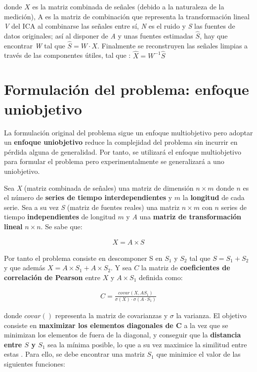  donde $X$ es la matriz combinada de señales (debido a la naturaleza de la medición), A es la matriz de combinación que representa la transformación lineal \textit{V} del ICA al combinarse las señales entre sí, \textit{N} es el ruido y \textit{S} las fuentes de datos originales; así al disponer de \textit{A} y unas fuentes estimadas $\hat{S}$, hay que encontrar \textit{W} tal que $\hat{S} = W\cdot X$. Finalmente se reconstruyen las señales limpias a través de las componentes útiles, tal que : $\hat{X} = W^{-1} \hat{S}$
 
 \section{Formulación del problema: enfoque uniobjetivo}
 
 La formulación original del problema sigue un enfoque multiobjetivo pero adoptar un \textbf{enfoque uniobjetivo} reduce la complejidad del problema sin incurrir en pérdida alguna de generalidad. Por tanto, se utilizará el enfoque multiobjetivo para formular el problema pero experimentalmente se generalizará a uno uniobjetivo.
 
 Sea \textit{X} (matriz combinada de señales) una matriz de dimensión $n\times m$ donde $n$ es el número de \textbf{series de tiempo interdependientes} y $m$ la \textbf{longitud} de cada serie. Sea a su vez \textit{S} (matriz de fuentes reales) una matriz $n\times m$ con $n$ series de tiempo \textbf{independientes} de longitud $m$ y \textit{A} una \textbf{matriz de transformación lineal} $n\times n$. Se sabe que:
 
  \begin{equation}
	 \begin{gathered}
	 	X = A\times S
	 \end{gathered}
 \end{equation}
 
 Por tanto el problema consiste en descomponer S en $S_1$ y $S_2$ tal que $S = S_1 +S_2$ y que además $X = A\times S_1 + A\times S_2$. Y sea $C$ la matriz de \textbf{coeficientes de correlación de Pearson} entre $X$ y $A\times S_1$ definida como:
 
 \begin{equation} \label{eq:covar}
	 \begin{gathered}
	 	C = \frac{covar(X,AS_1)}{\sigma(X)\cdot \sigma (A\cdot S_1)}
	 \end{gathered}
 \end{equation}
 
 donde $covar( )$ representa la matriz de covarianzas y $\sigma$ la varianza.
 El objetivo consiste en \textbf{maximizar los elementos diagonales de C} a la vez que se minimizan los elementos de fuera de la diagonal, y conseguir que la \textbf{distancia entre $S$ y $S_1$} sea la mínima posible, lo que a su vez maximice la similitud entre estas \cite{EvolutionaryBigOpt}. Para ello, se debe encontrar una matriz $S_1$ que minimice el valor de las siguientes funciones:
 
